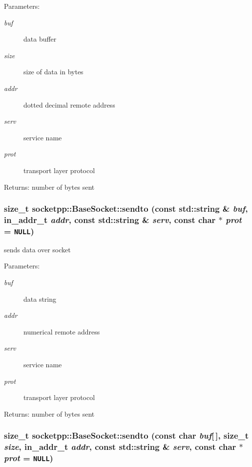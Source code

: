 \begin{Desc}
\item[Parameters:]
\begin{description}
\item[{\em buf}]data buffer \item[{\em size}]size of data in bytes \item[{\em addr}]dotted decimal remote address \item[{\em serv}]service name \item[{\em prot}]transport layer protocol \end{description}
\end{Desc}
\begin{Desc}
\item[Returns:]number of bytes sent \end{Desc}
\hypertarget{classsocketpp_1_1BaseSocket_4afc9ac34b702af852f2b52e68a90c3e}{
\subsubsection[{sendto}]{\setlength{\rightskip}{0pt plus 5cm}size\_\-t socketpp::BaseSocket::sendto (const std::string \& {\em buf}, \/  in\_\-addr\_\-t {\em addr}, \/  const std::string \& {\em serv}, \/  const char $\ast$ {\em prot} = {\tt NULL})}}
\label{classsocketpp_1_1BaseSocket_4afc9ac34b702af852f2b52e68a90c3e}


sends data over socket 

\begin{Desc}
\item[Parameters:]
\begin{description}
\item[{\em buf}]data string \item[{\em addr}]numerical remote address \item[{\em serv}]service name \item[{\em prot}]transport layer protocol \end{description}
\end{Desc}
\begin{Desc}
\item[Returns:]number of bytes sent \end{Desc}
\hypertarget{classsocketpp_1_1BaseSocket_0154d562be27c8b2aa074d5f6bb8ab03}{
\subsubsection[{sendto}]{\setlength{\rightskip}{0pt plus 5cm}size\_\-t socketpp::BaseSocket::sendto (const char {\em buf}\mbox{[}$\,$\mbox{]}, \/  size\_\-t {\em size}, \/  in\_\-addr\_\-t {\em addr}, \/  const std::string \& {\em serv}, \/  const char $\ast$ {\em prot} = {\tt NULL})}}
\label{classsocketpp_1_1BaseSocket_0154d562be27c8b2aa074d5f6bb8ab03}



